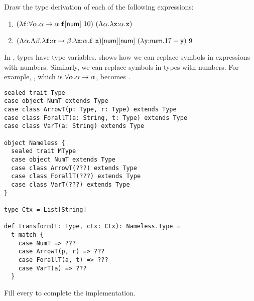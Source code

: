 \begin{exercise}

Draw the type derivation of each of the following expressions:

\begin{enumerate}
  \item
    $(\efunt{\cf}{\tforall{\alpha}{\tarrow{\alpha}{\alpha}}}{
      \etapp{\cf}{\tnum}\ 10})\ (\etfun{\alpha}{\efunt{\cx}{\alpha}{\cx}})$
  \item
    $
      \etapp{\etapp{(\etfun{\alpha}{\etfun{\beta}{
        \efunt{\cf}{\tarrow{\alpha}{\beta}}{
          \efunt{\cx}{\alpha}{\cf\ \cx}
        }
      }})}{\tnum}}{\tnum}\ (\efunt{\cy}{\tnum}{17-\cy})\ 9
    $
\end{enumerate}

\end{exercise}

\begin{exercise}

In \lang, types have type variables.
 shows how we can replace
symbols in expressions with numbers. Similarly, we can replace symbols in
types with numbers.  For example, , which is $\forall\alpha.\alpha\rightarrow\alpha$, becomes
.

\begin{verbatim}
sealed trait Type
case object NumT extends Type
case class ArrowT(p: Type, r: Type) extends Type
case class ForallT(a: String, t: Type) extends Type
case class VarT(a: String) extends Type

object Nameless {
  sealed trait MType
  case object NumT extends Type
  case class ArrowT(???) extends Type
  case class ForallT(???) extends Type
  case class VarT(???) extends Type
}

type Ctx = List[String]

def transform(t: Type, ctx: Ctx): Nameless.Type =
  t match {
    case NumT => ???
    case ArrowT(p, r) => ???
    case ForallT(a, t) => ???
    case VarT(a) => ???
  }
\end{verbatim}

Fill every  to complete the implementation.

\end{exercise}

